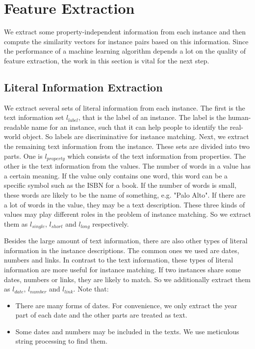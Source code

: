 \section{Feature Extraction}
\label{sec:extraction}

We extract some property-independent information from each instance and then compute the similarity vectors for instance pairs based on this information. Since the performance of a machine learning algorithm depends a lot on the quality of feature extraction, the work in this section is vital for the next step.

\subsection{Literal Information Extraction}
\label{sec:literal}

We extract several sets of literal information from each instance. The first is the text information set $l_{label}$, that is the label of an instance. The label is the human-readable name for an instance, such that it can help people to identify the real-world object. So labels are discriminative for instance matching. Next, we extract the remaining text information from the instance. These sets are divided into two parts. One is $l_{property}$ which consists of the text information from properties. The other is the text information from the values. The number of words in a value has a certain meaning. If the value only contains one word, this word can be a specific symbol such as the ISBN for a book. If the number of words is small, these words are likely to be the name of something, e.g. "Palo Alto". If there are a lot of words in the value, they may be a text description. These three kinds of values may play different roles in the problem of instance matching. So we extract them as $l_{single}$, $l_{short}$ and $l_{long}$ respectively.

Besides the large amount of text information, there are also other types of literal information in the instance descriptions. The common ones we used are dates, numbers and links. In contrast to the text information, these types of literal information are more useful for instance matching. If two instances share some dates, numbers or links, they are likely to match. So we additionally extract them as $l_{date}$, $l_{number}$ and $l_{link}$. Note that:
\begin{itemize}
\item There are many forms of dates. For convenience, we only extract the year part of each date and the other parts are treated as text.
\item Some dates and numbers may be included in the texts. We use meticulous string processing to find them.
\end{itemize}

